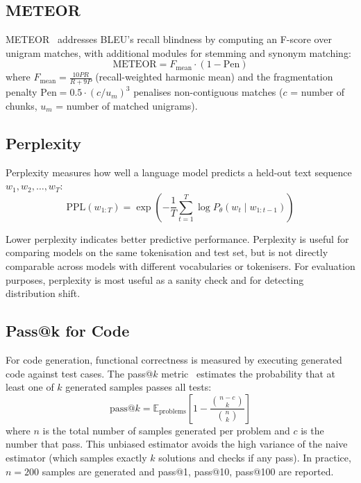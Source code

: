 \subsection{METEOR}
\label{meteor}

METEOR~\cite{banerjee2005meteor} addresses BLEU’s recall blindness by computing an F-score over unigram matches, with additional modules for stemming and synonym matching: 
\begin{equation}
    \text{METEOR} = F_{\text{mean}} \cdot (1 - \text{Pen})
\end{equation}
 where $F_{\text{mean}} = \frac{10PR}{R + 9P}$ (recall-weighted harmonic mean) and the fragmentation penalty $\text{Pen} = 0.5 \cdot (c/u_m)^3$ penalises non-contiguous matches ($c$ = number of chunks, $u_m$ = number of matched unigrams).

\subsection{Perplexity}
\label{perplexity}

Perplexity measures how well a language model predicts a held-out text sequence $w_1, w_2, \ldots, w_T$: 
\begin{equation}
    \text{PPL}(w_{1:T}) = \exp\!\left(-\frac{1}{T}\sum_{t=1}^{T} \log P_\theta(w_t \mid w_{1:t-1})\right)
\end{equation}

Lower perplexity indicates better predictive performance. Perplexity is useful for comparing models on the same tokenisation and test set, but is not directly comparable across models with different vocabularies or tokenisers. For evaluation purposes, perplexity is most useful as a sanity check and for detecting distribution shift.

\subsection{Pass@k for Code}
\label{passk-for-code}

For code generation, functional correctness is measured by executing generated code against test cases. The pass@$k$ metric~\cite{chen2021evaluating} estimates the probability that at least one of $k$ generated samples passes all tests: 
\begin{equation}
    \text{pass@}k = \mathbb{E}_{\text{problems}}\!\left[1 - \frac{\binom{n-c}{k}}{\binom{n}{k}}\right]
\end{equation}
 where $n$ is the total number of samples generated per problem and $c$ is the number that pass. This unbiased estimator avoids the high variance of the naive estimator (which samples exactly $k$ solutions and checks if any pass). In practice, $n = 200$ samples are generated and pass@1, pass@10, pass@100 are reported.

